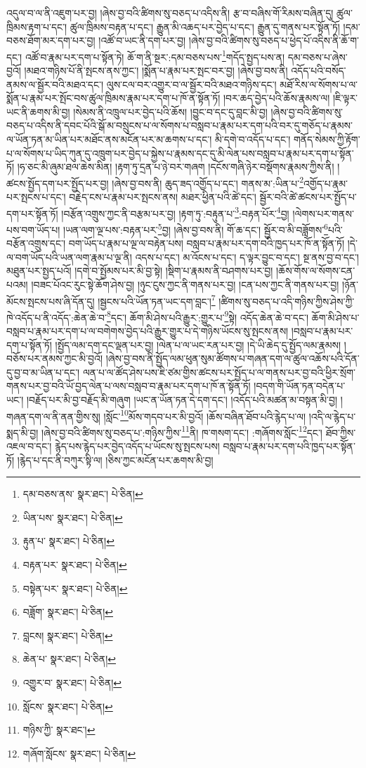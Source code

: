 འདུལ་བ་ལ་ནི་འཇུག་པར་བྱ། །ཞེས་བྱ་བའི་ཚིགས་སུ་བཅད་པ་འདིས་ནི། རྩ་བ་བཞིས་གོ་རིམས་བཞིན་དུ། ཚུལ་ཁྲིམས་རྟག་པ་དང་། ཚུལ་ཁྲིམས་བརྟན་པ་དང་། རྒྱུན་མི་འཆད་པར་བྱེད་པ་དང་། རྒྱུན་དུ་གནས་པར་སྟོན་ཏོ། །དམ་བཅས་ཐོག་མར་དག་པར་བྱ། །འཚོ་བ་ཡང་ནི་དག་པར་བྱ། །ཞེས་བྱ་བའི་ཚིགས་སུ་བཅད་པ་ཕྱེད་པོ་འདིས་ནི་ཆོ་ག་དང་། འཚོ་བ་རྣམ་པར་དག་པ་སྟོན་ཏེ། ཆོ་ག་ནི་སྔར་:དམ་བཅས་པས་\footnote{དམ་བཅས་ནས་  སྣར་ཐང་།  པེ་ཅིན། }གདོད་སྤྱད་པས་ན། དམ་བཅས་པ་ཞེས་བྱའོ། །མཐའ་གཉིས་པོ་ནི་སྤངས་ནས་ཀྱང་། །སྨོན་པ་རྣམ་པར་སྤང་བར་བྱ། །ཞེས་བྱ་བས་ནི། འདོད་པའི་བསོད་ནམས་ལ་སྦྱོར་བའི་མཐའ་དང་། ལུས་ངལ་བར་འགྱུར་བ་ལ་སྦྱོར་བའི་མཐའ་གཉིས་དང་། མཐོ་རིས་ལ་སོགས་པ་ལ་སྨོན་པ་རྣམ་པར་སྤོང་བས་ཚུལ་ཁྲིམས་རྣམ་པར་དག་པ་ཁོ་ན་སྟོན་ཏོ། །བར་ཆད་བྱེད་པའི་ཆོས་རྣམས་ལ། །ཇི་ལྟར་ཡང་ནི་ཆགས་མི་བྱ། །སེམས་ནི་འཁྲུལ་པར་བྱེད་པའི་ཆོས། །བྱུང་བ་དང་དུ་བླང་མི་བྱ། །ཞེས་བྱ་བའི་ཚིགས་སུ་བཅད་པ་འདིས་ནི་དབང་པོའི་སྒོ་མ་བསྲུངས་པ་ལ་སོགས་པ་བསླབ་པ་རྣམ་པར་དག་པའི་བར་དུ་གཅོད་པ་རྣམས་ལ་ཡོན་ཏན་མ་ཡིན་པར་མཐོང་ནས་མངོན་པར་མ་ཆགས་པ་དང་། མི་དགེ་བ་འདོད་པ་དང་། གནོད་སེམས་ཀྱི་རྟོག་པ་ལ་སོགས་པ་ཡིད་ཀུན་དུ་འཁྲུག་པར་བྱེད་པ་སྐྱེས་པ་རྣམས་དང་དུ་མི་ལེན་པས་བསླབ་པ་རྣམ་པར་དག་པ་སྟོན་ཏོ། །ཧ་ཅང་མི་ཞུམ་ཐལ་ཆེས་མིན། །རྟག་ཏུ་དྲན་པ་ཉེ་བར་གཞག །དངོས་གཞི་ཉེར་བསྡོགས་རྣམས་ཀྱིས་ནི། །ཚངས་སྤྱོད་དག་པར་སྤྱོད་པར་བྱ། །ཞེས་བྱ་བས་ནི། ཆུད་ཟད་འགྱོད་པ་དང་། གནས་མ་:ཡིན་པ་\footnote{ཡིན་པས་  སྣར་ཐང་།  པེ་ཅིན། }འགྱོད་པ་རྣམ་པར་སྤངས་པ་དང་། བརྗེད་ངས་པ་རྣམ་པར་སྤངས་ནས། མཐར་ཕྱིན་པའི་ཚེ་དང་། སྦྱོར་བའི་ཚེ་ཚངས་པར་སྤྱོད་པ་དག་པར་སྟོན་ཏོ། །བརྩོན་འགྲུས་ཀྱང་ནི་བརྩམ་པར་བྱ། །རྟག་ཏུ་:བརྟུན་པ་\footnote{རྟུན་པ་  སྣར་ཐང་།  པེ་ཅིན། }:བརྟན་པོར་\footnote{བརྟན་པར་  སྣར་ཐང་།  པེ་ཅིན། }བྱ། །ལེགས་པར་གནས་པས་བག་ཡོད་པ། །ཡན་ལག་ལྔ་པས་:བརྟན་པར་\footnote{བསྟེན་པར་  སྣར་ཐང་།  པེ་ཅིན། }བྱ། །ཞེས་བྱ་བས་ནི། གོ་ཆ་དང་། སྦྱོར་བ་མི་བཟློགས་\footnote{བཟློག་  སྣར་ཐང་།  པེ་ཅིན། }པའི་བརྩོན་འགྲུས་དང་། བག་ཡོད་པ་རྣམ་པ་ལྔ་ལ་བརྟེན་པས། བསླབ་པ་རྣམ་པར་དག་བའི་ཁྱད་པར་ཁོ་ན་སྟོན་ཏོ། །དེ་ལ་བག་ཡོད་པའི་ཡན་ལག་རྣམ་པ་ལྔ་ནི། འདས་པ་དང་། མ་འོངས་པ་དང་། ད་ལྟར་བྱུང་བ་དང་། སྔ་ནས་བྱ་བ་དང་། མཐུན་པར་སྤྱད་པའོ། །དགེ་བ་སྤྱོམས་པར་མི་བྱ་སྟེ། །སྡིག་པ་རྣམས་ནི་བཤགས་པར་བྱ། །ཆོས་གོས་ལ་སོགས་ངན་པའམ། །བཟང་པོའང་རུང་སྟེ་ཆོག་ཤེས་བྱ། །ཉུང་ངུས་ཀྱང་ནི་གནས་པར་བྱ། །ངན་པས་ཀྱང་ནི་གནས་པར་བྱ། །ཉོན་མོངས་སྤངས་པས་ཞི་དོན་དུ། །སྦྱངས་པའི་ཡོན་ཏན་ཡང་དག་བླང་།\footnote{བླངས།  སྣར་ཐང་།  པེ་ཅིན། } །ཚིགས་སུ་བཅད་པ་འདི་གཉིས་ཀྱིས་ཤེས་ཀྱི་ཁེ་འདོད་པ་ནི་འདོད་:ཆེན་ཆེ་བ་\footnote{ཆེན་པ་  སྣར་ཐང་།  པེ་ཅིན། }དང་། ཆོག་མི་ཤེས་པའི་རྒྱུར་:གྱུར་པ་\footnote{འགྱུར་བ་  སྣར་ཐང་།  པེ་ཅིན། }སྟེ། འདོད་ཆེན་ཆེ་བ་དང་། ཆོག་མི་ཤེས་པ་བསླབ་པ་རྣམ་པར་དག་པ་ལ་བགེགས་བྱེད་པའི་རྒྱུར་གྱུར་པ་དེ་གཉིས་ཡོངས་སུ་སྤངས་ནས། །བསླབ་པ་རྣམ་པར་དག་པ་སྟོན་ཏོ། །སྤྱོད་ལམ་དག་དང་ལྡན་པར་བྱ། །ལེན་པ་ལ་ཡང་རན་པར་བྱ། །དེ་ཡི་ཆེད་དུ་སྤྱོད་ལམ་རྣམས། །བཅོས་པར་ནམས་ཀྱང་མི་བྱའོ། །ཞེས་བྱ་བས་ནི་སྤྱོད་ལམ་ཕུན་སུམ་ཚོགས་པ་གཞན་དག་ལ་ཚུལ་འཆོས་པའི་དོན་དུ་བྱ་བ་མ་ཡིན་པ་དང་། ལན་པ་ལ་ཚོད་ཤེས་པས་ཇི་ཙམ་གྱིས་ཚངས་པར་སྤྱོད་པ་ལ་གནས་པར་བྱ་བའི་ཕྱིར་སྲོག་གནས་པར་བྱ་བའི་ཡོ་བྱད་ལེན་པ་ལས་བསླབ་བ་རྣམ་པར་དག་པ་ཁོ་ན་སྟོན་ཏོ། །བདག་གི་ཡོན་ཏན་བདེན་པ་ཡང་། །བརྗོད་པར་མི་བྱ་བརྗོད་མི་གཞུག །ཡང་ན་ཡོན་ཏན་དེ་དག་དང་། །འདོད་པའི་མཚན་མ་བསྟན་མི་བྱ། །གཞན་དག་ལ་ནི་ནན་གྱིས་སུ། །སློང་\footnote{སློངས་  སྣར་ཐང་།  པེ་ཅིན། }མོས་གདབ་པར་མི་བྱའོ། །ཆོས་བཞིན་ཐོབ་པའི་རྙེད་པ་ལ། །འདི་ལ་རྙེད་པ་སྨད་མི་བྱ། །ཞེས་བྱ་བའི་ཚིགས་སུ་བཅད་པ་:གཉིས་ཀྱིས་\footnote{གཉིས་ཀྱི་  སྣར་ཐང་། }ནི། ཁ་གསག་དང་། :གཞོགས་སློང་\footnote{གཞོག་སློངས་  སྣར་ཐང་།  པེ་ཅིན། }དང་། ཐོབ་ཀྱིས་འཇལ་བ་དང་། རྙེད་པས་རྙེད་པར་བྱེད་འདོད་པ་ཡོངས་སུ་སྤངས་པས། བསླབ་པ་རྣམ་པར་དག་པའི་ཁྱད་པར་སྟོན་ཏོ། །རྙེད་པ་དང་ནི་བཀུར་སྟི་ལ། །ཅིས་ཀྱང་མངོན་པར་ཆགས་མི་བྱ། 